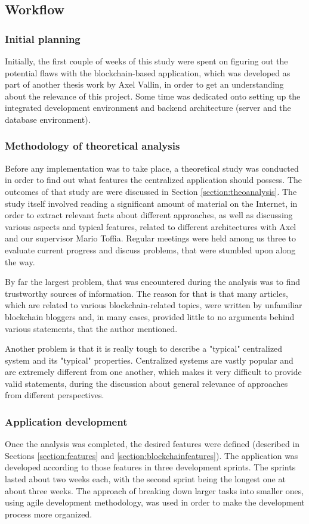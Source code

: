 \subsection{Workflow}

\subsubsection{Initial planning}
Initially, the first couple of weeks of this study were spent on figuring out the potential flaws with the blockchain-based application, which was developed as part of another thesis work by Axel Vallin, in order to get an understanding about the relevance of this project. Some time was dedicated onto setting up the integrated development environment and backend architecture (server and the database environment).

\subsubsection{Methodology of theoretical analysis}
Before any implementation was to take place, a theoretical study was conducted in order to find out what features the centralized application should possess. The outcomes of that study are were discussed in Section \ref{section:theoanalysis}. The study itself involved reading a significant amount of material on the Internet, in order to extract relevant facts about different approaches, as well as discussing various aspects and typical features, related to different architectures with Axel and our supervisor Mario Toffia. Regular meetings were held among us three to evaluate current progress and discuss problems, that were stumbled upon along the way. 

By far the largest problem, that was encountered during the analysis was to find trustworthy sources of information. The reason for that is that many articles, which are related to various blockchain-related topics, were written by unfamiliar blockchain bloggers and, in many cases, provided little to no arguments behind various statements, that the author mentioned.

Another problem is that it is really tough to describe a "typical" centralized system and its "typical" properties. Centralized systems are vastly popular and are extremely different from one another, which makes it very difficult to provide valid statements, during the discussion about general relevance of approaches from different perspectives.

\subsubsection{Application development} \label{section:development}
Once the analysis was completed, the desired features were defined (described in Sections \ref{section:features} and \ref{section:blockchainfeatures}). The application was developed according to those features in three development sprints. The sprints lasted about two weeks each, with the second sprint being the longest one at about three weeks. The approach of breaking down larger tasks into smaller ones, using agile development methodology, was used in order to make the development process more organized.

